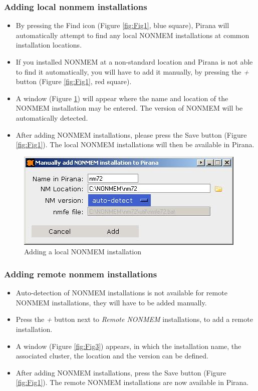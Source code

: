 \subsubsection*{Adding local nonmem installations }
\begin{itemize}
\item By pressing the Find icon (Figure \ref{fig:Fig1}, blue square), Pirana will
  automatically attempt to find any local NONMEM installations at
  common installation locations.
\item If you installed NONMEM at a non-standard location and Pirana is
  not able to find it automatically, you will have to add it manually, by
  pressing the \emph{\Large{+}} button (Figure \ref{fig:Fig1}, red square).
\item A window (Figure \ref{fig:Fig2}) will appear where the name and location of
  the NONMEM installation may be entered. The version of NONMEM will
  be automatically detected.
\item After adding NONMEM installations, please press the Save button (Figure
  \ref{fig:Fig1}). The local NONMEM installations will then be available in Pirana.
\end{itemize}

\begin{figure}[h] \centering
    \includegraphics[scale=.5]{images/addnonmem_2.jpg}
    \caption{Adding a local NONMEM installation\label{fig:Fig2}}
\end{figure}

\subsubsection*{Adding remote nonmem installations }
\begin{itemize}
\item Auto-detection of NONMEM installations is not available for
  remote NONMEM installations, they will have to be added manually.
\item Press the \emph{\Large{+}} button next to \emph{Remote NONMEM}
  installations, to add a remote installation.
\item A window (Figure \ref{fig:Fig3}) appears, in which the installation name, the
  associated cluster, the location and the version can be defined.
\item After adding NONMEM installations, press the Save button (Figure
  \ref{fig:Fig1}). The remote NONMEM installations are now available in Pirana.
\end{itemize}

